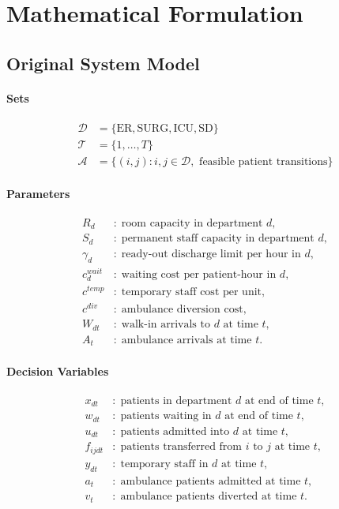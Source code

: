 \documentclass[11pt]{article}
\begin{document}
\section{Mathematical Formulation}

\subsection{Original System Model}

\paragraph{Sets}
\begin{align*}
\mathcal{D} &= \{\text{ER}, \text{SURG}, \text{ICU}, \text{SD}\} \\
\mathcal{T} &= \{1,\dots,T\} \\
\mathcal{A} &= \{(i,j): i,j \in \mathcal{D}, \text{ feasible patient transitions}\}
\end{align*}

\paragraph{Parameters}
\begin{align*}
R_d &:\; \text{room capacity in department } d, \\
S_d &:\; \text{permanent staff capacity in department } d, \\
\gamma_d &:\; \text{ready-out discharge limit per hour in } d, \\
c_d^{wait} &:\; \text{waiting cost per patient-hour in } d, \\
c^{temp} &:\; \text{temporary staff cost per unit}, \\
c^{div} &:\; \text{ambulance diversion cost}, \\
W_{dt} &:\; \text{walk-in arrivals to } d \text{ at time } t, \\
A_t &:\; \text{ambulance arrivals at time } t.
\end{align*}

\paragraph{Decision Variables}
\begin{align*}
x_{dt} &:\; \text{patients in department } d \text{ at end of time } t, \\
w_{dt} &:\; \text{patients waiting in } d \text{ at end of time } t, \\
u_{dt} &:\; \text{patients admitted into } d \text{ at time } t, \\
f_{ijdt} &:\; \text{patients transferred from } i \text{ to } j \text{ at time } t, \\
y_{dt} &:\; \text{temporary staff in } d \text{ at time } t, \\
a_t &:\; \text{ambulance patients admitted at time } t, \\
v_t &:\; \text{ambulance patients diverted at time } t.
\end{align*}
\end{document}
